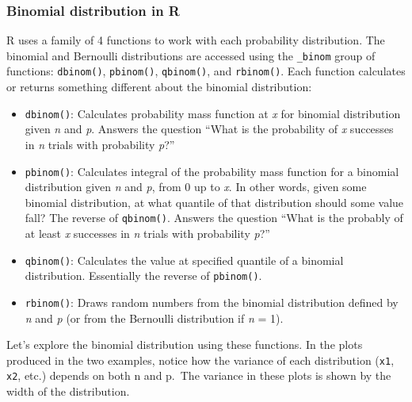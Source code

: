 \documentclass[
  13,
  letterpaper,
]{report}
\providecommand{\tightlist}{%
  \setlength{\itemsep}{0pt}\setlength{\parskip}{0pt}}
\begin{document}
\subsubsection{Binomial distribution in R}\label{sec-dist-binom-r}

R uses a family of 4 functions to work with each probability
distribution. The binomial and Bernoulli distributions are accessed
using the \texttt{\_binom} group of functions: \texttt{dbinom()},
\texttt{pbinom()}, \texttt{qbinom()}, and \texttt{rbinom()}. Each
function calculates or returns something different about the binomial
distribution:

\begin{itemize}
\tightlist
\item
  \texttt{dbinom()}: Calculates probability mass function at \emph{x}
  for binomial distribution given \emph{n} and \emph{p}. Answers the
  question ``What is the probability of \emph{x} successes in \emph{n}
  trials with probability \emph{p}?''
\item
  \texttt{pbinom()}: Calculates integral of the probability mass
  function for a binomial distribution given \emph{n} and \emph{p}, from
  0 up to \emph{x}. In other words, given some binomial distribution, at
  what quantile of that distribution should some value fall? The reverse
  of \texttt{qbinom()}. Answers the question ``What is the probably of
  at least \emph{x} successes in \emph{n} trials with probability
  \emph{p}?''
\item
  \texttt{qbinom()}: Calculates the value at specified quantile of a
  binomial distribution. Essentially the reverse of \texttt{pbinom()}.
\item
  \texttt{rbinom()}: Draws random numbers from the binomial distribution
  defined by \emph{n} and \emph{p} (or from the Bernoulli distribution
  if \emph{n} = 1).
\end{itemize}

Let's explore the binomial distribution using these functions. In the
plots produced in the two examples, notice how the variance of each
distribution (\texttt{x1}, \texttt{x2}, etc.) depends on both n and
p.~The variance in these plots is shown by the width of the
distribution.
\end{document}
